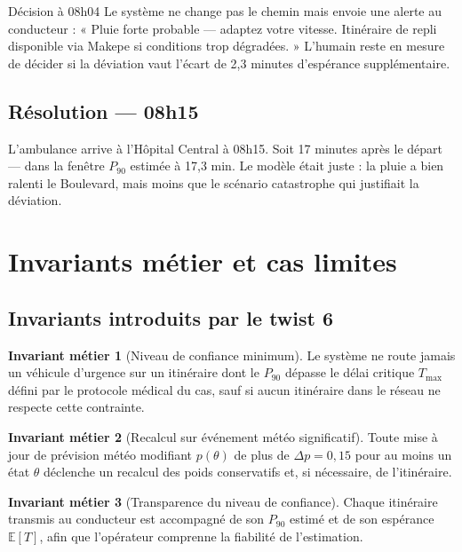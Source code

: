 \documentclass[12pt,a4paper]{article}
\theoremstyle{definition}
\newtheorem{invariant}{Invariant métier}[section]
\theoremstyle{remark}
\begin{document}
\begin{metierbox}{Décision à 08h04}
Le système ne change pas le chemin mais envoie une alerte au
conducteur : « Pluie forte probable — adaptez votre vitesse.
Itinéraire de repli disponible via Makepe si conditions trop
dégradées. » L'humain reste en mesure de décider si la déviation
vaut l'écart de 2,3 minutes d'espérance supplémentaire.
\end{metierbox}

\subsection{Résolution — 08h15}

L'ambulance arrive à l'Hôpital Central à 08h15. Soit 17 minutes
après le départ — dans la fenêtre $P_{90}$ estimée à 17,3 min.
Le modèle était juste : la pluie a bien ralenti le Boulevard, mais
moins que le scénario catastrophe qui justifiait la déviation.

\newpage

\section{Invariants métier et cas limites}

\subsection{Invariants introduits par le twist 6}

\begin{invariant}[Niveau de confiance minimum]
Le système ne route jamais un véhicule d'urgence sur un itinéraire
dont le $P_{90}$ dépasse le délai critique $T_{\max}$ défini par
le protocole médical du cas, sauf si aucun itinéraire dans le
réseau ne respecte cette contrainte.
\end{invariant}

\begin{invariant}[Recalcul sur événement météo significatif]
Toute mise à jour de prévision météo modifiant $p(\theta)$ de plus
de $\Delta p = 0{,}15$ pour au moins un état $\theta$ déclenche un
recalcul des poids conservatifs et, si nécessaire, de l'itinéraire.
\end{invariant}

\begin{invariant}[Transparence du niveau de confiance]
Chaque itinéraire transmis au conducteur est accompagné de son
$P_{90}$ estimé et de son espérance $\mathbb{E}[T]$, afin que
l'opérateur comprenne la fiabilité de l'estimation.
\end{invariant}
\end{document}
